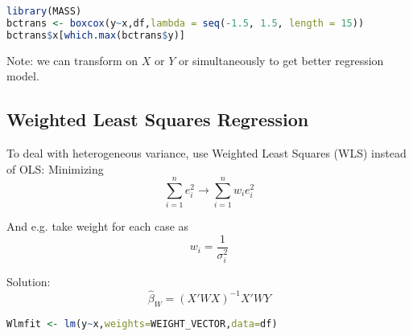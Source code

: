 \begin{itemize}[topsep=2pt,itemsep=2pt]
\begin{itemize}[topsep=2pt,itemsep=2pt]
                
            \end{itemize}
            
                
            
\begin{rcode}
\begin{lstlisting}[language=R]
library(MASS)
bctrans <- boxcox(y~x,df,lambda = seq(-1.5, 1.5, length = 15))
bctrans$x[which.max(bctrans$y)]
\end{lstlisting}

    \end{rcode}
            
            
        Note: we can transform on $ X $ or $ Y $ or simultaneously to get better regression model.
        
    \end{itemize}

\subsection{Weighted Least Squares Regression}
    To deal with heterogeneous variance, use Weighted Least Squares (WLS) instead of OLS: Minimizing
    \begin{equation}
        \sum_{i=1}^ne_i^2\longrightarrow \sum_{i=1}^nw_ie^2_i         
    \end{equation}
    
    And e.g. take weight for each case as 
    \begin{equation}
        w_i=\dfrac{1}{\sigma _i^2} 
    \end{equation}

    Solution:
    \begin{equation}
        \hat{\beta }_W=(X'WX)^{-1}X'WY 
    \end{equation}
    
    
\begin{rcode}
\begin{lstlisting}[language=R]
Wlmfit <- lm(y~x,weights=WEIGHT_VECTOR,data=df)
\end{lstlisting}
\end{rcode}
    
    
    








